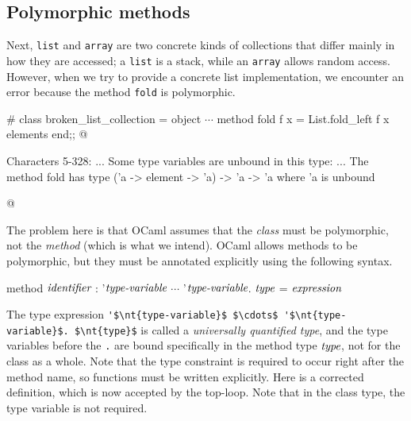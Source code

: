 \subsection{Polymorphic methods}

Next, \hbox{\lstinline/list/} and \hbox{\lstinline/array/} are two concrete
kinds of collections that differ mainly in how they are accessed; a \hbox{\lstinline/list/} is a stack,
while an \hbox{\lstinline/array/} allows random access.  However, when we try to provide a concrete list
implementation, we encounter an error because the method \hbox{\lstinline/fold/} is polymorphic.

\begin{ocaml}
# class broken_list_collection =
  object
     $\cdots$
     method fold f x = List.fold_left f x elements
  end;;
@
\begin{toperror}
Characters 5-328: ...
Some type variables are unbound in this type:
...
The method fold has type ('a -> element -> 'a) -> 'a -> 'a where 'a
is unbound
\end{toperror}
@
\end{ocaml}
%
\label{types:polymorphic-methods}
The problem here is that OCaml assumes that
the \emph{class} must be polymorphic, not the \emph{method} (which is what we intend).  OCaml allows
methods to be polymorphic, but they must be annotated explicitly using the following syntax.

\begin{ocaml}
method $\textit{\rmfamily identifier}$ : '$\textit{\rmfamily type-variable}$ $\cdots$ '$\textit{\rmfamily type-variable}$. $\textit{\rmfamily type}$ = $\textit{\rmfamily expression}$
\end{ocaml}
%
\label{classes:type-quantifier}
The type expression \hbox{\lstinline/'$\nt{type-variable}$ $\cdots$ '$\nt{type-variable}$. $\nt{type}$/} is
called a \emph{universally quantified type}, and the type variables before the \hbox{\lstinline/./} are
bound specifically in the method type $\textit{\rmfamily type}$, not for the class as a whole.  Note that the type
constraint is required to occur right after the method name, so functions must be written explicitly.
Here is a corrected definition, which is now accepted by the top-loop.  Note that in the class type,
the type variable is not required.

